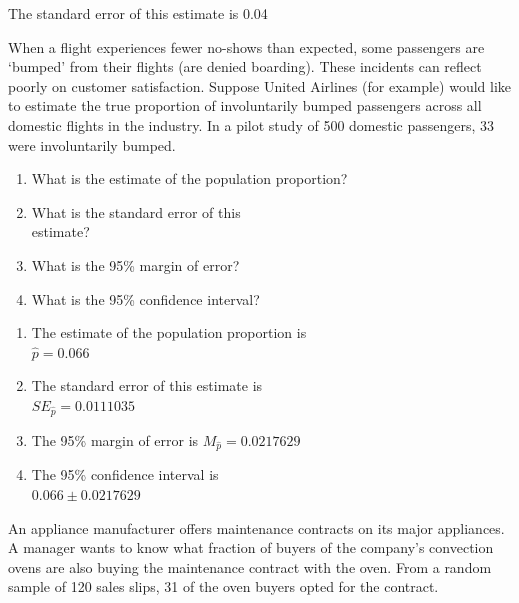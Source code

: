 \documentclass[11pt, chapterprefix=true]{scrbook}\usepackage[]{graphicx}\usepackage[]{color}
\begin{document}
\begin{exercises}
\begin{solution}
The standard error of this estimate is 0.04

\end{solution}

\begin{exercise} %

When a flight experiences fewer no-shows than expected, some passengers are \\ `bumped' from their flights (are denied boarding).  These incidents can reflect poorly on customer satisfaction.  Suppose United Airlines (for example) would like to estimate the true proportion of involuntarily bumped passengers across all domestic flights in the industry.  In a pilot study of 500 domestic passengers, 33 were involuntarily bumped.

\begin{enumerate}
\item	What is the estimate of the population proportion?
\item	What is the standard error of this \\ estimate?
\item	What is the 95\% margin of error?
\item	What is the 95\% confidence interval?
\end{enumerate}
\end{exercise}
\begin{solution} %


\begin{enumerate}
\item	The estimate of the population proportion is \\ $\hat{p} = 0.066$
\item	The standard error of this estimate is \\ $SE_{\hat{p}} = 0.0111035$
\item	The 95\% margin of error is $M_{\hat{p}} = 0.0217629$
\item	The 95\% confidence interval is \\ $0.066 \pm 0.0217629$
\end{enumerate}
\end{solution}

\begin{exercise} %

An appliance manufacturer offers maintenance contracts on its major appliances.  A manager wants to know what fraction of buyers of the company's convection ovens are also buying the maintenance contract with the oven.  From a random sample of 120 sales slips, 31 of the oven buyers opted for the contract.


\end{exercise}
\end{exercises}
\end{document}

